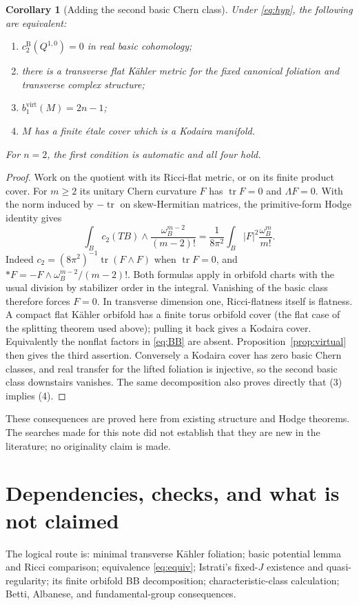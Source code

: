 \documentclass[12pt]{amsart}
\newtheorem{cor}[thm]{Corollary}
\theoremstyle{definition}
\theoremstyle{remark}
\numberwithin{equation}{section}
\DeclareMathOperator{\tr}{tr}
\newcommand{\bas}{\mathrm{B}}
\newcommand{\virt}{\mathrm{virt}}
\begin{document}
\begin{cor}[Adding the second basic Chern class]\label{cor:c2}
Under \eqref{eq:hyp}, the following are equivalent:
\begin{enumerate}
\item $c_2^{\bas}(Q^{1,0})=0$ in real basic cohomology;
\item there is a transverse flat K\"ahler metric for the fixed canonical
foliation and transverse complex structure;
\item $b_1^{\virt}(M)=2n-1$;
\item $M$ has a finite \'etale cover which is a Kodaira manifold.
\end{enumerate}
For $n=2$, the first condition is automatic and all four hold.
\end{cor}
\begin{proof}
Work on the quotient with its Ricci-flat metric, or on its finite
product cover. For $m\geq2$ its unitary Chern curvature $F$ has
$\tr F=0$ and $\Lambda F=0$. With the norm induced by $-\tr$ on
skew-Hermitian matrices, the primitive-form Hodge identity gives
\begin{equation}\label{eq:c2}
\int_B c_2(TB)\wedge\frac{\omega_B^{m-2}}{(m-2)!}
=\frac1{8\pi^2}\int_B |F|^2\frac{\omega_B^m}{m!}.
\end{equation}
Indeed $c_2=(8\pi^2)^{-1}\tr(F\wedge F)$ when $\tr F=0$,
and $*F=-F\wedge\omega_B^{m-2}/(m-2)!$. Both formulas apply in
orbifold charts with the usual division by stabilizer order in the
integral. Vanishing of the basic class therefore forces $F=0$.
In transverse dimension one, Ricci-flatness itself is flatness.
A compact flat K\"ahler orbifold has a finite torus orbifold cover
(the flat case of the splitting theorem used above); pulling it back
gives a Kodaira cover. Equivalently the nonflat factors in
\eqref{eq:BB} are absent. Proposition~\ref{prop:virtual} then gives
the third assertion. Conversely a Kodaira cover has zero basic Chern
classes, and real transfer for the lifted foliation is injective, so
the second basic class downstairs vanishes. The same decomposition
also proves directly that (3) implies (4).
\end{proof}

These consequences are proved here from existing structure and Hodge
theorems. The searches made for this note did not establish that they
are new in the literature; no originality claim is made.

\appendix
\section{Dependencies, checks, and what is not claimed}\label{sec:audit}
The logical route is: minimal transverse K\"ahler foliation;
basic potential lemma and Ricci comparison; equivalence
\eqref{eq:equiv}; Istrati's fixed-$J$ existence and quasi-regularity;
its finite orbifold BB decomposition; characteristic-class calculation;
Betti, Albanese, and fundamental-group consequences.
\end{document}

